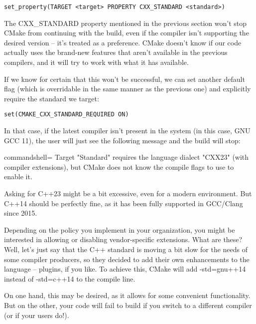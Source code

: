 \begin{lstlisting}[style=styleCMake]
set_property(TARGET <target> PROPERTY CXX_STANDARD <standard>)
\end{lstlisting}


The CXX\_STANDARD property mentioned in the previous section won't stop CMake from continuing with the build, even if the compiler isn't supporting the desired version – it's treated as a preference. CMake doesn't know if our code actually uses the brand-new features that aren't available in the previous compilers, and it will try to work with what it has available.

If we know for certain that this won't be successful, we can set another default flag (which is overridable in the same manner as the previous one) and explicitly require the standard we target:

\begin{lstlisting}[style=styleCMake]
set(CMAKE_CXX_STANDARD_REQUIRED ON)
\end{lstlisting}

In that case, if the latest compiler isn't present in the system (in this case, GNU GCC 11), the user will just see the following message and the build will stop:

\begin{tcblisting}{commandshell={}}
Target "Standard" requires the language dialect "CXX23" (with
compiler extensions), but CMake does not know the compile flags
to use to enable it.
\end{tcblisting}

Asking for C++23 might be a bit excessive, even for a modern environment. But C++14 should be perfectly fine, as it has been fully supported in GCC/Clang since 2015.


Depending on the policy you implement in your organization, you might be interested in allowing or disabling vendor-specific extensions. What are these? Well, let's just say that the C++ standard is moving a bit slow for the needs of some compiler producers, so they decided to add their own enhancements to the language – plugins, if you like. To achieve this, CMake will add -std=gnu++14 instead of -std=c++14 to the compile line.

On one hand, this may be desired, as it allows for some convenient functionality. But on the other, your code will fail to build if you switch to a different compiler (or if your users do!).

